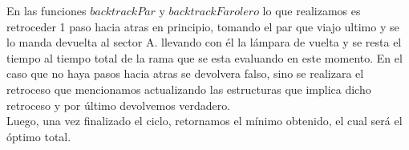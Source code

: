 En las funciones $backtrackPar$ y $backtrackFarolero$ lo que realizamos es retroceder 1 paso hacia atras en principio, tomando el par que viajo ultimo y se lo manda devuelta al sector A. llevando con \'el la l\'ampara de vuelta y se resta el tiempo al tiempo total de la rama que se esta evaluando en este momento. En el caso que no haya pasos hacia atras se devolvera falso, sino se realizara el retroceso que mencionamos actualizando las estructuras que implica dicho retroceso y por \'ultimo devolvemos verdadero.\\

Luego, una vez finalizado el ciclo, retornamos el m\'inimo obtenido, el cual ser\'a el \'optimo total.

 